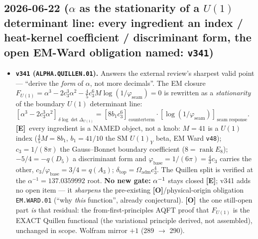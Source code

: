 \documentclass[11pt]{article}
\providecommand{\mE}{\textbf{[E]}}\providecommand{\mC}{\textbf{[C]}}
\providecommand{\mO}{\textbf{[O]}}\providecommand{\mX}{\textbf{[X]}}
\providecommand{\vref}[1]{\texttt{#1}}
\providecommand{\cthree}{c_3}\providecommand{\phiz}{\varphi_0^{\mathrm{ret}}}
\begin{document}
\subsection*{2026-06-22 ($\alpha$ as the stationarity of a $U(1)$ determinant line: every ingredient an index / heat-kernel coefficient / discriminant form, the open EM-Ward obligation named: \texttt{v341})}
\begin{itemize}
\item \textbf{\texttt{v341} (\texttt{ALPHA.QUILLEN.01}).} Answers the external review's sharpest valid point ---
``derive the \emph{form} of $\alpha$, not more decimals''. The EM closure
$F_{U(1)}=\alpha^3-2\cthree^3\alpha^2-\tfrac45\cthree^6 M\log(1/\varphi_{\mathrm{seam}})=0$ is rewritten as a
\emph{stationarity} of the boundary $U(1)$ determinant line:
$[\alpha^3-2\cthree^3\alpha^2]_{\,\delta\log\det\Delta_{U(1)}}=[8b_1\cthree^6]_{\,\text{counterterm}}\cdot
[\log(1/\varphi_{\mathrm{seam}})]_{\,\text{seam response}}$. \mE\ every ingredient is a NAMED object, not a knob:
$M{=}41$ is a $U(1)$ index ($\tfrac45 M=8b_1$, $b_1{=}41/10$ the SM $U(1)_Y$ beta, EM Ward \vref{v48});
$\cthree{=}1/(8\pi)$ the Gauss--Bonnet boundary coefficient ($8{=}\operatorname{rank}E_8$); $-5/4=-q(D_5)$ a
discriminant form and $\varphi_{\mathrm{base}}{=}1/(6\pi){=}\tfrac43\cthree$ carries the other,
$\cthree/\varphi_{\mathrm{base}}{=}3/4{=}q(A_3)$; $\delta_{\mathrm{top}}{=}\Omega_{\mathrm{adm}}\cthree^4$. The
Quillen split is verified at the $\alpha^{-1}{=}137.0359992$ root. \textbf{No new gate:} $\alpha^{-1}$ stays closed
\mE; v341 adds no open item --- it \emph{sharpens} the pre-existing \mO/physical-origin obligation
\texttt{EM.WARD.01} (``why \emph{this} function'', already conjectural). \mO\ the one still-open part \emph{is} that
residual: the from-first-principles AQFT proof that $F_{U(1)}$ is the EXACT Quillen functional (the variational
principle derived, not assembled), unchanged in scope. Wolfram mirror $+1$ (289 $\to$ 290).
\end{itemize}
\end{document}
